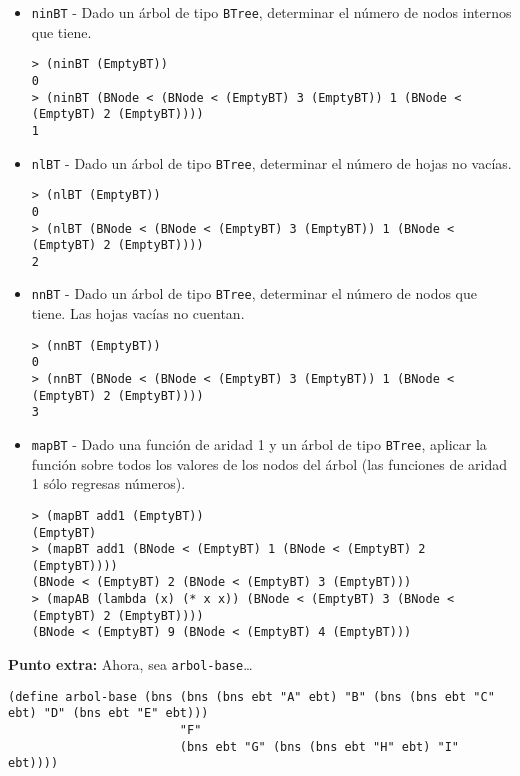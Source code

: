 \documentclass{article}
\begin{document}
\newpage
\begin{itemize}
\item \texttt{ninBT} - Dado un árbol de tipo \verb;BTree;, determinar el número de nodos internos que tiene.
\begin{verbatim}
> (ninBT (EmptyBT))
0
> (ninBT (BNode < (BNode < (EmptyBT) 3 (EmptyBT)) 1 (BNode < (EmptyBT) 2 (EmptyBT))))
1
\end{verbatim}

\item \texttt{nlBT} - Dado un árbol de tipo \verb;BTree;, determinar el número de hojas no vacías.
\begin{verbatim}
> (nlBT (EmptyBT))
0
> (nlBT (BNode < (BNode < (EmptyBT) 3 (EmptyBT)) 1 (BNode < (EmptyBT) 2 (EmptyBT))))
2
\end{verbatim}

\item \texttt{nnBT} - Dado un árbol de tipo \verb;BTree;, determinar el número de nodos que tiene. Las hojas vacías no cuentan.
\begin{verbatim}
> (nnBT (EmptyBT))
0
> (nnBT (BNode < (BNode < (EmptyBT) 3 (EmptyBT)) 1 (BNode < (EmptyBT) 2 (EmptyBT))))
3
\end{verbatim}

\item \texttt{mapBT} - Dado una función de aridad 1 y un árbol de tipo \verb;BTree;, aplicar la función sobre todos los valores de los nodos del árbol (las funciones de aridad 1 sólo regresas números).
\begin{verbatim}
> (mapBT add1 (EmptyBT))
(EmptyBT)
> (mapBT add1 (BNode < (EmptyBT) 1 (BNode < (EmptyBT) 2 (EmptyBT))))
(BNode < (EmptyBT) 2 (BNode < (EmptyBT) 3 (EmptyBT)))
> (mapAB (lambda (x) (* x x)) (BNode < (EmptyBT) 3 (BNode < (EmptyBT) 2 (EmptyBT))))
(BNode < (EmptyBT) 9 (BNode < (EmptyBT) 4 (EmptyBT)))
\end{verbatim}
\end{itemize}

\newpage
\textbf{Punto extra:}
Ahora, sea \verb;arbol-base;\dots
\begin{verbatim}
(define arbol-base (bns (bns (bns ebt "A" ebt) "B" (bns (bns ebt "C" ebt) "D" (bns ebt "E" ebt))) 
                        "F"
                        (bns ebt "G" (bns (bns ebt "H" ebt) "I" ebt))))
\end{verbatim}
\end{document}
